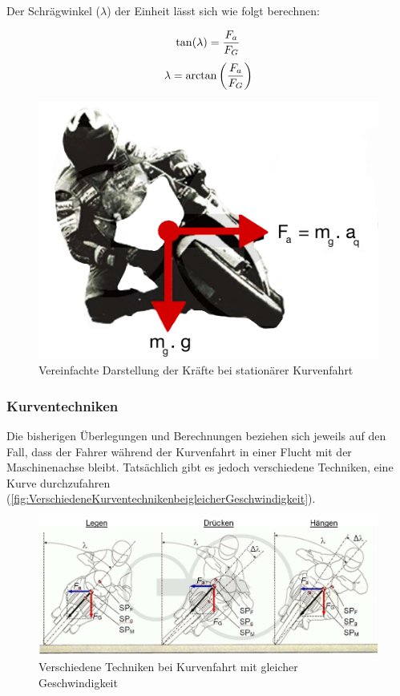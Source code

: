 Der Schrägwinkel ($\lambda$) der Einheit lässt sich wie folgt berechnen:


\begin{align*}
	\centering
	\tan(\lambda)  =  \frac{F_a}{F_G}
\end{align*}
\begin{align}
	\centering
	\lambda  =  \arctan \left(\frac{F_a}{F_G}\right)
	\label{gl:Schraegwinkel}
\end{align}


\begin{figure}
	\centering
	\includegraphics[width=0.6\linewidth]{Bilder/VereinfachteDarstellungDerKraefteBeiStationaererKurvenfahrt2_pdf.pdf}
	\caption{Vereinfachte Darstellung der Kräfte bei stationärer Kurvenfahrt \citep{Haedrich2012}}
	\label{fig:VereinfachteDarstellungDerKraefteBeiStationaererKurvenfahrt}
\end{figure}


\subsubsection{Kurventechniken}
Die bisherigen Überlegungen und Berechnungen beziehen sich jeweils auf den Fall, dass der Fahrer während der Kurvenfahrt in einer Flucht mit der Maschinenachse bleibt. Tatsächlich gibt es jedoch verschiedene Techniken, eine Kurve durchzufahren (\autoref{fig:VerschiedeneKurventechnikenbeigleicherGeschwindigkeit}).
\begin{figure}
	\centering
	\includegraphics[width=\linewidth]{Bilder/VerschiedeneKurventechnikenbeigleicherGeschwindigkeit_pdf.pdf}
	\caption{Verschiedene Techniken bei Kurvenfahrt mit gleicher Geschwindigkeit \citep{Haedrich2012}}
	\label{fig:VerschiedeneKurventechnikenbeigleicherGeschwindigkeit}
\end{figure}


